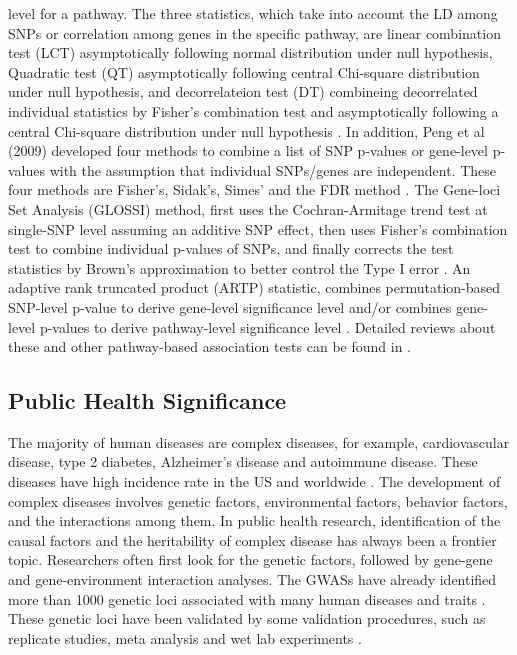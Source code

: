 \documentclass[12pt]{article}
\begin{document}
level for a pathway. The three statistics, which take into account the LD among SNPs or correlation among genes in the specific pathway, are linear combination test (LCT) asymptotically following normal distribution under null hypothesis, Quadratic test (QT) asymptotically following central Chi-square distribution under null hypothesis, and decorrelateion test (DT) combineing decorrelated individual statistics by Fisher's combination test and asymptotically following a central Chi-square distribution under null hypothesis \cite{Luo2010}. In addition, Peng et al (2009) developed four methods to combine a list of SNP p-values or gene-level p-values with the assumption that individual SNPs/genes are independent. These four methods are Fisher's, Sidak's, Simes' and the FDR method \cite{peng2009gene}. The Gene-loci Set Analysis (GLOSSI) method, first uses the Cochran-Armitage trend test at single-SNP level assuming an additive SNP effect, then uses Fisher's combination test to combine individual p-values of SNPs, and finally corrects the test statistics by Brown's approximation to better control the Type I error \cite{Chai2009}. An adaptive rank truncated product (ARTP) statistic, combines permutation-based SNP-level p-value to derive gene-level significance level and/or combines gene-level p-values to derive pathway-level significance level \cite{Yu2009}. Detailed reviews about these and other pathway-based association tests can be found in \cite{tintle2011inflated,Wang2010,Fridley2011}. 

\subsection{Public Health Significance}\label{sec:PHsig}
The majority of human diseases are complex diseases, for example, cardiovascular disease, type 2 diabetes, Alzheimer's disease and autoimmune disease. These diseases have high incidence rate in the US and worldwide 
\cite{Craig2008,Inzucchi2012,Go2013,Association2014,Benros2014}. The development of complex diseases involves genetic factors, environmental factors, behavior factors, and the interactions among them. In public health research, identification of the causal factors and the heritability of complex disease has always been a frontier topic. Researchers often first look for the genetic factors, followed by gene-gene and gene-environment interaction analyses.  The GWASs have already identified more than 1000 genetic loci associated with many human diseases and traits \cite{Hindorff2009}. These genetic loci have been validated by some validation procedures, such as replicate studies, meta analysis and wet lab experiments \cite{Wang2005,Hirschhorn2005,McCarthy2008,Hindorff2009,Cantor2010}. 
\end{document}
